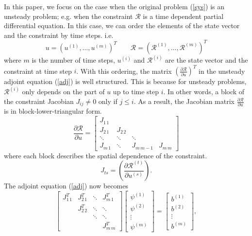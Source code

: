\documentclass{elsart}
\theoremstyle{remark}
\theoremstyle{definition}
\theoremstyle{proof}
\begin{document}
    In this paper, we focus on the case when the original problem (\ref{sys}) is
    an unsteady problem; e.g. when the constraint $\mathcal{R}$ is a time
    dependent partial differential equation.  In this case, we can order the
    elements of the state vector and the constraint by time steps.
    i.e.
    \[ u = \left( u^{(1)}, \ldots, u^{(m)} \right)^T  \qquad
           \mathcal{R} = \left( \mathcal{R}^{(1)}, \ldots,
                                \mathcal{R}^{(m)} \right)^T
    \]
    where $m$ is the number of time steps, $u^{(i)}$ and $\mathcal{R}^{(i)}$ are
    the state vector and the constraint at time step $i$.  With this ordering,
    the matrix $\left( \frac{\partial\mathcal{R}}{\partial u} \right)^T$
    in the unsteady adjoint equation (\ref{adj}) is well structured.  This is
    because for unsteady problems, $\mathcal{R}^{(i)}$ only depends on the part
    of $u$ up to time step $i$.  In other words, a block of the constraint
    Jacobian $J_{i j} \ne 0$ only if $j\le i$.  As a result, the Jacobian matrix
    $\frac{\partial \mathcal{R}}{\partial u}$
    is in block-lower-triangular form.
    \begin{equation} \label{lower}
        \frac{\partial \mathcal{R}}{\partial u} =
        \begin{bmatrix}
            J_{1\,1} &          &            & \\
            J_{2\,1} & J_{2\,2} &            & \\
            \ddots   & \ddots   & \ddots     & \\
            J_{m\,1} & \ddots   & J_{m\,m-1} & J_{m\,m}
        \end{bmatrix}
    \end{equation}
    where each block describes the spatial dependence of the constraint.
    \[ J_{t s} =
        \left( \frac{\partial \mathcal{R}^{(t)}}{\partial u^{(s)}} \right).
    \]
    The adjoint equation (\ref{adj}) now becomes
    \begin{equation} \label{uadj}
        \begin{bmatrix}
        J_{1\,1}^T & J_{2\,1}^T & \ddots     & J_{m\,1}^T   \\
                   & J_{2\,2}^T & \ddots     & \ddots       \\
                   &            & \ddots     & \ddots       \\
                   &            &            & J_{m\,m}^T
        \end{bmatrix}
        \begin{bmatrix}
            \psi^{(1)} \\ \psi^{(2)} \\ \vdots \\ \psi^{(m)}
        \end{bmatrix}
        = \begin{bmatrix} b^{(1)} \\ b^{(2)} \\ \vdots \\ b^{(m)} \end{bmatrix},
    \end{equation}
\end{document}
